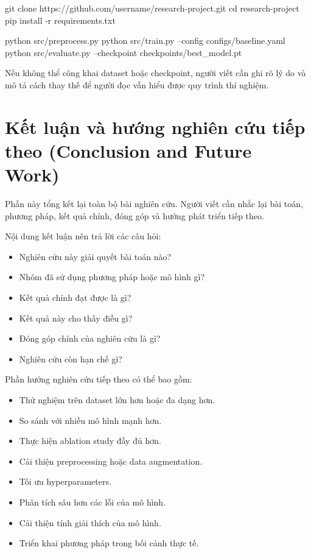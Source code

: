 \documentclass[12pt]{ai_conquer2026}
\begin{document}
\begin{aivnoutputbox}
git clone https://github.com/username/research-project.git
cd research-project
pip install -r requirements.txt

python src/preprocess.py
python src/train.py --config configs/baseline.yaml
python src/evaluate.py --checkpoint checkpoints/best_model.pt
\end{aivnoutputbox}

Nếu không thể công khai dataset hoặc checkpoint, người viết cần ghi rõ lý do và mô tả cách thay thế để người đọc vẫn hiểu được quy trình thí nghiệm.

\section{Kết luận và hướng nghiên cứu tiếp theo (Conclusion and Future Work)}

Phần này tổng kết lại toàn bộ bài nghiên cứu. Người viết cần nhắc lại bài toán, phương pháp, kết quả chính, đóng góp và hướng phát triển tiếp theo.

Nội dung kết luận nên trả lời các câu hỏi:

\begin{itemize}
\item Nghiên cứu này giải quyết bài toán nào?
\item Nhóm đã sử dụng phương pháp hoặc mô hình gì?
\item Kết quả chính đạt được là gì?
\item Kết quả này cho thấy điều gì?
\item Đóng góp chính của nghiên cứu là gì?
\item Nghiên cứu còn hạn chế gì?
\end{itemize}

Phần hướng nghiên cứu tiếp theo có thể bao gồm:

\begin{itemize}
\item Thử nghiệm trên dataset lớn hơn hoặc đa dạng hơn.
\item So sánh với nhiều mô hình mạnh hơn.
\item Thực hiện ablation study đầy đủ hơn.
\item Cải thiện preprocessing hoặc data augmentation.
\item Tối ưu hyperparameters.
\item Phân tích sâu hơn các lỗi của mô hình.
\item Cải thiện tính giải thích của mô hình.
\item Triển khai phương pháp trong bối cảnh thực tế.
\end{itemize}
\end{document}
